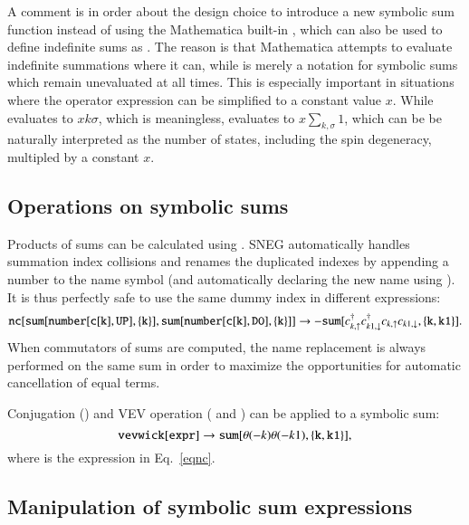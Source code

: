 \documentclass[3p,number,preprint]{elsarticle}
\begin{document}
A comment is in order about the design choice to introduce a new
symbolic sum function  instead of using the Mathematica
built-in , which can also be used to define indefinite sums
as . The reason is that Mathematica  attempts
to evaluate indefinite summations where it can, while  is
merely a notation for symbolic sums which remain unevaluated at all
times. This is especially important in situations where the operator
expression can be simplified to a constant value $x$. While
 evaluates to $x k \sigma$, which is meaningless,
 evaluates to $x \sum_{k,\sigma} 1$, which can
be be naturally interpreted as the number of states, including the
spin degeneracy, multipled by a constant $x$.


\subsection{Operations on symbolic sums}

Products of sums can be calculated using . SNEG automatically
handles summation index collisions and renames the duplicated indexes
by appending a number to the name symbol (and automatically declaring
the new name using ). It is thus perfectly safe
to use the same dummy index in different expressions:
%
\begin{equation}
\label{eqnc}
{\tt nc[sum[number[c[k], UP], \{k\}], sum[number[c[k], DO], \{k\}]]}
\to
-{\tt sum}[c^\dag_{k,\uparrow} c^\dag_{k1,\downarrow}
c_{k,\uparrow} c_{k1,\downarrow}, {\tt \{k,k1\}}].
\end{equation}
%
When commutators of sums are computed, the name replacement is always
performed on the same sum in order to maximize the opportunities for
automatic cancellation of equal terms.

Conjugation () and VEV operation ( and
) can be applied to a symbolic sum:
%
\begin{equation}
{\tt vevwick[expr]} \to {\tt sum}[\theta(-k)\theta(-k1),{\tt \{k,k1\}}],
\end{equation}
%
where  is the expression in Eq.~\eqref{eqnc}.

\subsection{Manipulation of symbolic sum expressions}
\end{document}
